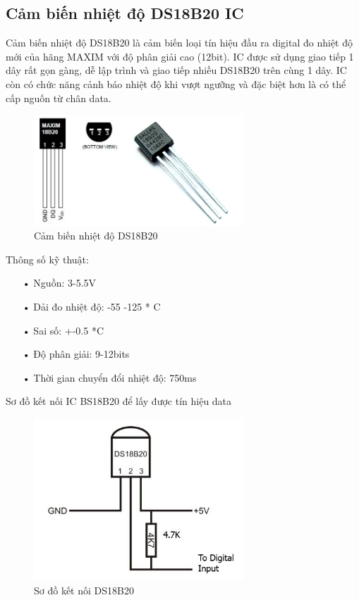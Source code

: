 \subsection*{Cảm biến nhiệt độ DS18B20 IC} 
Cảm biến nhiệt độ DS18B20 là cảm biến loại tín hiệu đầu ra digital đo nhiệt độ mới của hãng MAXIM với độ phân giải cao (12bit). IC được sử dụng giao tiếp 1 dây rất gọn gàng, dễ lập trình và giao tiếp nhiều DS18B20 trên cùng 1 dây. IC còn có chức năng cảnh báo nhiệt độ khi vượt ngưỡng và đặc biệt hơn là có thể cấp nguốn từ chân data.
\begin{center}
\begin{figure}[htp]
\centering    
\includegraphics[width=0.7\textwidth]{ds18b20}
\caption[Cảm biến nhiệt độ DS18B20]{Cảm biến nhiệt độ DS18B20}
\label{fig:ds18b20}
\end{figure}
\end{center}
Thông số kỹ thuật:
\begin{itemize}
\item[•]Nguồn: 3-5.5V
\item[•]Dải đo nhiệt độ: -55 -125 * C
\item[•]Sai số: +-0.5 *C
\item[•]Độ phân giải: 9-12bits
\item[•]Thời gian chuyển đổi nhiệt độ: 750ms
\end{itemize}
Sơ đồ kết nối IC BS18B20 để lấy được tín hiệu data
\begin{center}
\begin{figure}[htp]
\centering    
\includegraphics[width=0.7\textwidth]{ds18b20_ketnoi}
\caption[Sơ đồ kết nối DS18B20]{Sơ đồ kết nối DS18B20}
\label{fig:ds18b20_ketnoi}
\end{figure}
\end{center}	

